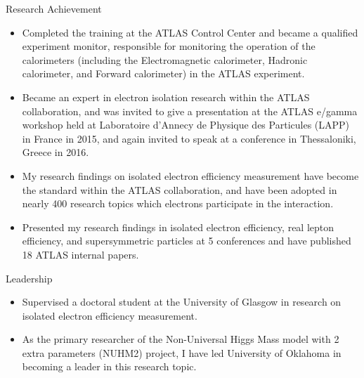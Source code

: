 \documentclass[margin, 10pt]{res} %
\begin{document}
\begin{resume}
\begin{itemize}
\end{itemize}
\textrm{Research Achievement}
\begin{itemize}
    \item Completed the training at the ATLAS Control Center and became a qualified experiment monitor, responsible for monitoring the operation of the calorimeters (including the Electromagnetic calorimeter, Hadronic calorimeter, and Forward calorimeter) in the ATLAS experiment.
    \item Became an expert in electron isolation research within the ATLAS collaboration, and was invited to give a presentation at the ATLAS e/gamma workshop held at Laboratoire d'Annecy de Physique des Particules (LAPP) in France in 2015, and again invited to speak at a conference in Thessaloniki, Greece in 2016.
    \item My research findings on isolated electron efficiency measurement have become the standard within the ATLAS collaboration, and have been adopted in nearly 400 research topics which electrons participate in the interaction.
    \item Presented my research findings in isolated electron efficiency, real lepton efficiency, and supersymmetric particles at 5 conferences and have published 18 ATLAS internal papers.
\end{itemize}
\textrm{Leadership}
\begin{itemize}
    \item Supervised a doctoral student at the University of Glasgow in research on isolated electron efficiency measurement.
    \item As the primary researcher of the Non-Universal Higgs Mass model with 2 extra parameters (NUHM2) project, I have led University of Oklahoma in becoming a leader in this research topic.
\end{itemize}


\end{resume}
\end{document}
